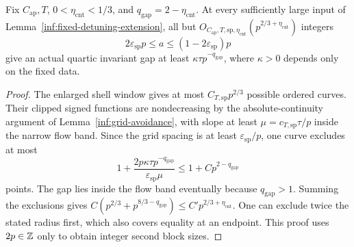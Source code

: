 \begin{lemma}
\label{inf:many-splits}
Fix $C_{\mathrm{ap}},T$, $0<\eta_{\mathrm{cnt}}<1/3$, and
$q_{\mathrm{gap}}=2-\eta_{\mathrm{cnt}}$. At every sufficiently large input of
Lemma~\ref{inf:fixed-detuning-extension}, all but
$O_{C_{\mathrm{ap}},T,\mathrm{sp},\eta_{\mathrm{cnt}}}
 (p^{2/3+\eta_{\mathrm{cnt}}})$ integers
\[
 2\varepsilon_{\mathrm{sp}}p\le a\le(1-2\varepsilon_{\mathrm{sp}})p
\]
give an actual quartic invariant gap at least
$\kappa\tau p^{-q_{\mathrm{gap}}}$, where $\kappa>0$ depends only
on the fixed data.
\end{lemma}
\begin{proof}
The enlarged shell window gives at most $C_{T,\mathrm{sp}}p^{2/3}$
possible ordered curves. Their clipped signed functions are
nondecreasing by the absolute-continuity argument of
Lemma~\ref{inf:grid-avoidance}, with slope at least
$\mu=c_{T,\mathrm{sp}}\tau/p$ inside the narrow flow band.
Since the grid spacing is at least $\varepsilon_{\mathrm{sp}}/p$,
one curve excludes at most
\[
 1+\frac{2p\kappa\tau p^{-q_{\mathrm{gap}}}}
          {\varepsilon_{\mathrm{sp}}\mu}
 \le 1+C p^{2-q_{\mathrm{gap}}}
\]
points. The gap lies inside the flow band eventually because
$q_{\mathrm{gap}}>1$. Summing the exclusions gives
$C(p^{2/3}+p^{8/3-q_{\mathrm{gap}}})\le C'p^{2/3+\eta_{\mathrm{cnt}}}$.
One can exclude twice the stated radius first, which also covers
equality at an endpoint. This proof uses $2p\in\mathbb{Z}$ only to obtain
integer second block sizes.
\end{proof}

